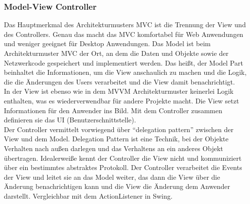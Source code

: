 \setcounter{secnumdepth}{3}
\subsubsection{Model-View Controller}
Das Hauptmerkmal des Architekturmusters \ac{MVC} ist die Trennung der View und des Controllers. Genau das macht das MVC komfortabel f\"ur Web Anwendungen und weniger geeignet f\"ur Desktop Anwendungen\cite{Syromiatnikov2014}.
Das Model ist beim Architekturmuster \ac{MVC} der Ort, an dem die Daten und Objekte sowie der Netzwerkcode gespeichert und implementiert werden. Das hei\ss{}t, der Model Part beinhaltet die Informationen, um die View anschaulich zu machen und die Logik, die die \"Anderungen des Users verarbeitet und die View damit benachrichtigt\cite{Leff2001}.\\
In der View ist ebenso wie in dem \ac{MVVM} Architekturmuster keinerlei Logik enthalten, was es wiederverwendbar f\"ur andere Projekte macht.\cite{Peres2016} Die View setzt Informationen f\"ur den Anwender ins Bild. Mit dem Controller zusammen definieren sie das \ac{UI} (Benutzerschnittstelle)\cite{Leff2001}.\\
Der Controller vermittelt vorwiegend \"uber \enquote{delegation pattern} zwischen der View und dem Model. Delegation Pattern ist eine Technik, bei der Objekte Verhalten nach au\ss{}en darlegen und das Verhaltens an ein anderes Objekt \"ubertragen\cite{TU-Wien2013}. Idealerwei\ss{}e kennt der Controller die View nicht und kommuniziert \"uber ein bestimmtes abstraktes Protokoll\cite{Peres2016}.
Der Controller verarbeitet die Events der View und leitet sie an das Model weiter, das dann die View \"uber die \"Anderung benachrichtigen kann und die View die \"Anderung dem Anwender darstellt. Vergleichbar mit dem ActionListener in Swing\cite{Singer2004}.
